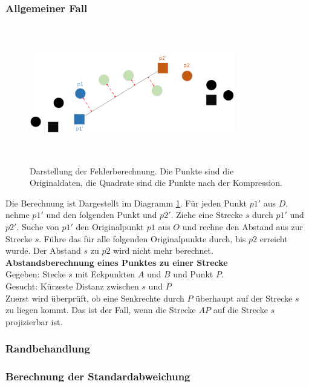 \subsubsection{Allgemeiner Fall}
\begin{figure}[!htbp]
	\center
	\includegraphics[width=0.8\textwidth,height=6cm,keepaspectratio]{./pictures/testsetup/errorcalc.png}
	\caption{Darstellung der Fehlerberechnung. Die Punkte sind die Originaldaten, die Quadrate sind die Punkte nach der Kompression.}
	\label{testsetup:ablauf:fehlerberechnung:diagramm}
\end{figure} 
Die Berechnung ist Dargestellt im Diagramm \ref{testsetup:ablauf:fehlerberechnung:diagramm}. Für jeden Punkt $p1'$ aus $D$, nehme $p1'$ und den folgenden Punkt und $p2'$. Ziehe eine Strecke $s$ durch $p1'$ und $p2'$. Suche von $p1'$ den Originalpunkt $p1$ aus $O$ und rechne den Abstand aus zur Strecke $s$. Führe das für alle folgenden Originalpunkte durch, bis $p2$ erreicht wurde. Der Abstand $s$ zu $p2$ wird nicht mehr berechnet.\\
[\baselineskip]
\textbf{Abstandsberechnung eines Punktes zu einer Strecke}\\
Gegeben: Stecke $s$ mit Eckpunkten $A$ und $B$ und Punkt $P$.\\
Gesucht: Kürzeste Distanz zwischen $s$ und $P$\\
[\baselineskip]
Zuerst wird überprüft, ob eine Senkrechte durch $P$ überhaupt auf der Strecke $s$ zu liegen kommt. Das ist der Fall, wenn die Strecke $AP$ auf die Strecke $s$ projizierbar ist.



\subsubsection{Randbehandlung}


\subsubsection{Berechnung der Standardabweichung}
